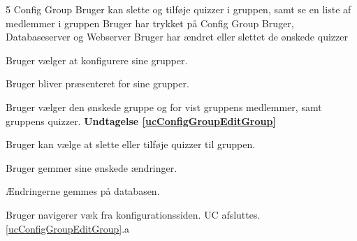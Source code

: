 \uchead
	{5} %
	{Config Group} %
	{Bruger kan slette og tilføje quizzer i gruppen, samt se en liste af medlemmer i gruppen} %
	{Bruger har trykket på Config Group} %
	{Bruger, Databaseserver og Webserver} %
	{} %
	{} %
	{Bruger har ændret eller slettet de ønskede quizzer} %


\item Bruger vælger at konfigurere sine grupper.

\item Bruger bliver præsenteret for sine grupper.

\item\label{ucConfigGroupEditGroup} Bruger vælger den ønskede gruppe og for vist gruppens medlemmer, samt gruppens quizzer. \textbf{Undtagelse \ref{ucConfigGroupEditGroup}}

\item Bruger kan vælge at slette eller tilføje quizzer til gruppen.

\item Bruger gemmer sine ønskede ændringer.

\item Ændringerne gemmes på databasen.


\ucdescriptionend %

\ucextension
	{Bruger navigerer væk fra konfigurationssiden.}
	{UC afsluttes.}
	{\ref{ucConfigGroupEditGroup}.a}

